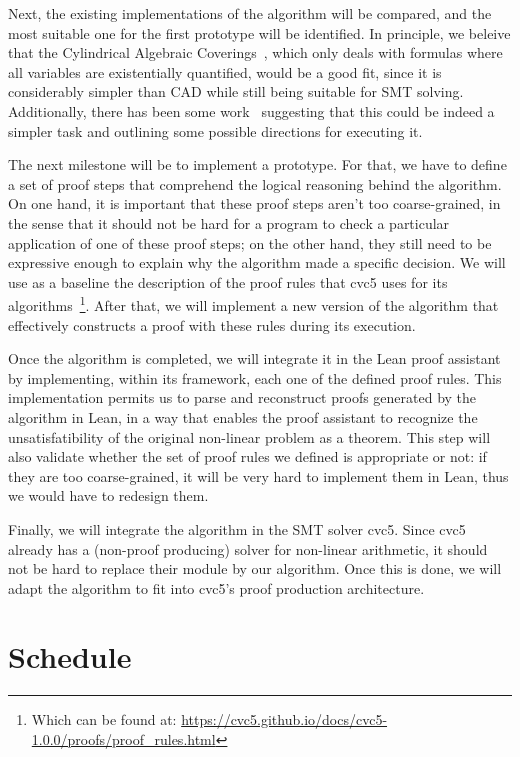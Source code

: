 \documentclass[a4paper, 12pt]{article}
\begin{document}
Next, the existing implementations of the algorithm will be compared, and the most suitable one for the
first prototype will be identified. In principle, we beleive that the Cylindrical Algebraic
Coverings~\cite{coverings}, which only deals with formulas where all variables are existentially quantified,
would be a good fit, since it is considerably simpler than CAD while still being suitable for SMT solving. Additionally, there has been
some work~\cite{proofsCac} suggesting that this could be indeed a simpler task and
outlining some possible directions for executing it.

The next milestone will be to implement a prototype. For that, we have to define a set of proof steps
that comprehend the logical reasoning behind the algorithm. On one hand, it is important that
these proof steps aren't too coarse-grained, in the sense that it should not be hard for a program to check a particular application
of one of these proof steps;
on the other hand, they still need to be expressive enough to explain why the algorithm made a specific decision.
We will use as a baseline the description of the proof rules that cvc5 uses for its algorithms~\footnote{Which can be found at: \href{https://cvc5.github.io/docs/cvc5-1.0.0/proofs/proof\_rules.html}{https://cvc5.github.io/docs/cvc5-1.0.0/proofs/proof\_rules.html}}.
After that, we will implement a new version of the algorithm that effectively constructs a proof with these rules during its execution.

Once the algorithm is completed, we will integrate it in the Lean proof assistant by implementing, within its framework,
each one of the defined proof rules. This implementation permits us to parse and reconstruct proofs generated by the algorithm
in Lean, in a way that enables the proof assistant to recognize the unsatisfatibility of the
original non-linear problem as a theorem. This step will also validate whether the set of proof
rules we defined is appropriate or not: if they are too coarse-grained, it will be very hard to implement them
in Lean, thus we would have to redesign them.

Finally, we will integrate the algorithm in the SMT solver cvc5. Since cvc5 already has a (non-proof producing) solver for
non-linear arithmetic, it should not be hard to replace their module by our algorithm. Once this is done, we will adapt the
algorithm to fit into cvc5's proof production architecture.


\section{Schedule}
\end{document}
